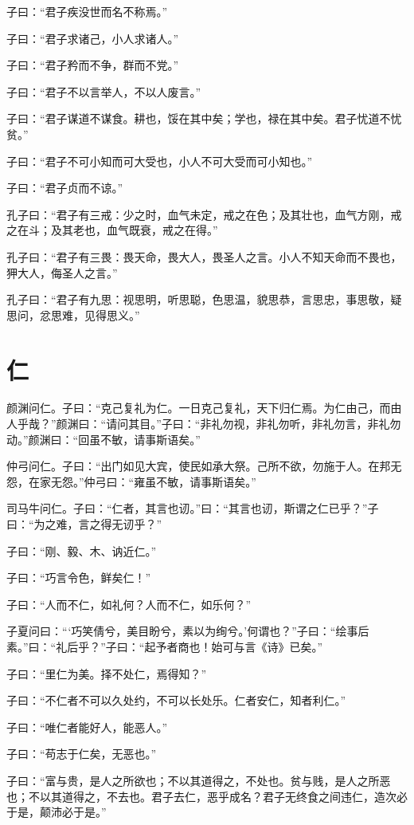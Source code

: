 \documentclass[a5paper]{ctexbook}
\begin{document}
    子曰：“君子疾没世而名不称焉。”

    子曰：“君子求诸己，小人求诸人。”

    子曰：“君子矜而不争，群而不党。”

    子曰：“君子不以言举人，不以人废言。”

    子曰：“君子谋道不谋食。耕也，馁在其中矣；学也，禄在其中矣。君子忧道不忧贫。”

    子曰：“君子不可小知而可大受也，小人不可大受而可小知也。”

    子曰：“君子贞而不谅。”

    孔子曰：“君子有三戒：少之时，血气未定，戒之在色；及其壮也，血气方刚，戒之在斗；及其老也，血气既衰，戒之在得。”

    孔子曰：“君子有三畏：畏天命，畏大人，畏圣人之言。小人不知天命而不畏也，狎大人，侮圣人之言。”

    孔子曰：“君子有九思：视思明，听思聪，色思温，貌思恭，言思忠，事思敬，疑思问，忿思难，见得思义。”

    \chapter{仁}

    颜渊问仁。子曰：“克己复礼为仁。一日克己复礼，天下归仁焉。为仁由己，而由人乎哉？”颜渊曰：“请问其目。”子曰：“非礼勿视，非礼勿听，非礼勿言，非礼勿动。”颜渊曰：“回虽不敏，请事斯语矣。”

    仲弓问仁。子曰：“出门如见大宾，使民如承大祭。己所不欲，勿施于人。在邦无怨，在家无怨。”仲弓曰：“雍虽不敏，请事斯语矣。”

    司马牛问仁。子曰：“仁者，其言也讱。”曰：“其言也讱，斯谓之仁已乎？”子曰：“为之难，言之得无讱乎？”

    子曰：“刚、毅、木、讷近仁。”

    子曰：“巧言令色，鲜矣仁！”

    子曰：“人而不仁，如礼何？人而不仁，如乐何？”

    子夏问曰：“‘巧笑倩兮，美目盼兮，素以为绚兮。’何谓也？”子曰：“绘事后素。”曰：“礼后乎？”子曰：“起予者商也！始可与言《诗》已矣。”

    子曰：“里仁为美。择不处仁，焉得知？”

    子曰：“不仁者不可以久处约，不可以长处乐。仁者安仁，知者利仁。”

    子曰：“唯仁者能好人，能恶人。”

    子曰：“苟志于仁矣，无恶也。”

    子曰：“富与贵，是人之所欲也；不以其道得之，不处也。贫与贱，是人之所恶也；不以其道得之，不去也。君子去仁，恶乎成名？君子无终食之间违仁，造次必于是，颠沛必于是。”
\end{document}
